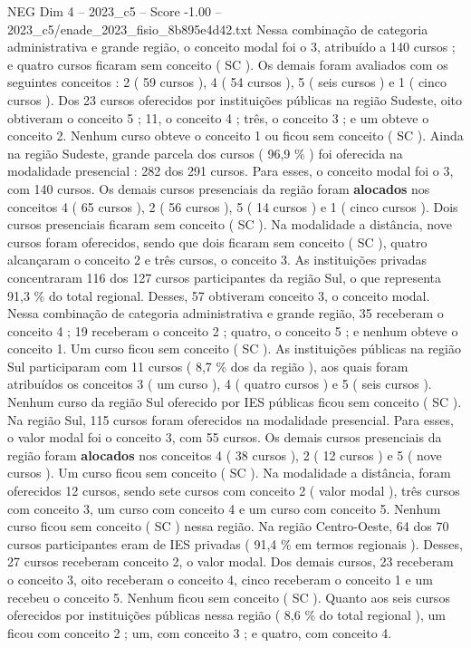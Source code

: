 \begin{textsample}{NEG Dim 4 – 2023\_c5 – Score -1.00 – 2023\_c5/enade\_2023\_fisio\_8b895e4d42.txt}
Nessa combinação de categoria administrativa e grande região, o conceito modal foi o 3, atribuído a 140 cursos ; e quatro cursos ficaram sem conceito ( SC ).
Os demais foram avaliados com os seguintes conceitos : 2 ( 59 cursos ), 4 ( 54 cursos ), 5 ( seis cursos ) e 1 ( cinco cursos ).
Dos 23 cursos oferecidos por instituições públicas na região Sudeste, oito obtiveram o conceito 5 ; 11, o conceito 4 ; três, o conceito 3 ; e um obteve o conceito 2.
Nenhum curso obteve o conceito 1 ou ficou sem conceito ( SC ).
Ainda na região Sudeste, grande parcela dos cursos ( 96,9 \% ) foi oferecida na modalidade presencial : 282 dos 291 cursos.
Para esses, o conceito modal foi o 3, com 140 cursos.
Os demais cursos presenciais da região foram \textbf{alocados} nos conceitos 4 ( 65 cursos ), 2 ( 56 cursos ), 5 ( 14 cursos ) e 1 ( cinco cursos ).
Dois cursos presenciais ficaram sem conceito ( SC ).
Na modalidade a distância, nove cursos foram oferecidos, sendo que dois ficaram sem conceito ( SC ), quatro alcançaram o conceito 2 e três cursos, o conceito 3.
As instituições privadas concentraram 116 dos 127 cursos participantes da região Sul, o que representa 91,3 \% do total regional.
Desses, 57 obtiveram conceito 3, o conceito modal.
Nessa combinação de categoria administrativa e grande região, 35 receberam o conceito 4 ; 19 receberam o conceito 2 ; quatro, o conceito 5 ; e nenhum obteve o conceito 1.
Um curso ficou sem conceito ( SC ).
As instituições públicas na região Sul participaram com 11 cursos ( 8,7 \% dos da região ), aos quais foram atribuídos os conceitos 3 ( um curso ), 4 ( quatro cursos ) e 5 ( seis cursos ).
Nenhum curso da região Sul oferecido por IES públicas ficou sem conceito ( SC ).
Na região Sul, 115 cursos foram oferecidos na modalidade presencial.
Para esses, o valor modal foi o conceito 3, com 55 cursos.
Os demais cursos presenciais da região foram \textbf{alocados} nos conceitos 4 ( 38 cursos ), 2 ( 12 cursos ) e 5 ( nove cursos ).
Um curso ficou sem conceito ( SC ).
Na modalidade a distância, foram oferecidos 12 cursos, sendo sete cursos com conceito 2 ( valor modal ), três cursos com conceito 3, um curso com conceito 4 e um curso com conceito 5.
Nenhum curso ficou sem conceito ( SC ) nessa região.
Na região Centro-Oeste, 64 dos 70 cursos participantes eram de IES privadas ( 91,4 \% em termos regionais ).
Desses, 27 cursos receberam conceito 2, o valor modal.
Dos demais cursos, 23 receberam o conceito 3, oito receberam o conceito 4, cinco receberam o conceito 1 e um recebeu o conceito 5.
Nenhum ficou sem conceito ( SC ).
Quanto aos seis cursos oferecidos por instituições públicas nessa região ( 8,6 \% do total regional ), um ficou com conceito 2 ; um, com conceito 3 ; e quatro, com conceito 4.

\end{textsample}
